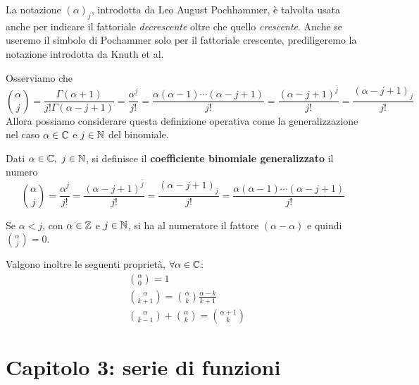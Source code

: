 \begin{attention}
		La notazione $\left(\alpha\right)_j$, introdotta da Leo August Pochhammer, è talvolta usata anche per indicare il fattoriale \textit{decrescente} oltre che quello \textit{crescente}. Anche se useremo il simbolo di Pochammer solo per il fattoriale crescente, prediligeremo la notazione introdotta da Knuth et al. %
\end{attention}
Osserviamo che
\begin{equation*}
	\binom{\alpha}{j}=\frac{\Gamma\left(\alpha+1\right)}{j!\Gamma\left(\alpha-j+1\right)}=\frac{\alpha^{\underline{j}}}{j!}=\frac{\alpha\left(\alpha-1\right)\cdots\left(\alpha-j+1\right)}{j!}=\frac{\left(\alpha-j+1\right)^{\overline{j}}}{j!}=\frac{\left(\alpha-j+1\right)_j}{j!}
\end{equation*}
Allora possiamo considerare questa definizione operativa come la generalizzazione nel caso $\alpha\in\mathbb{C}$ e $j\in\mathbb{N}$ del binomiale.
\begin{define}
	Dati $\alpha\in\complexset,\ j\in\naturalset$, si definisce il \textbf{coefficiente binomiale generalizzato} il numero
	\begin{equation}
		\binom{\alpha}{j}=\frac{\alpha^{\underline{j}}}{j!}=\frac{\left(\alpha-j+1\right)^{\overline{j}}}{j!}=\frac{\left(\alpha-j+1\right)_j}{j!}=\frac{\alpha\left(\alpha-1\right)\cdots\left(\alpha-j+1\right)}{j!}
	\end{equation}
\end{define}
\begin{observe}
	Se $\alpha<j$, con $\alpha\in\mathbb{Z}$ e $j\in\mathbb{N}$, si ha al numeratore il fattore $\left(\alpha-\alpha\right)$ e quindi $\displaystyle\binom{\alpha}{j}=0$.
\end{observe}
Valgono inoltre le seguenti proprietà, $\forall \alpha\in\mathbb{C}$:
\begin{align}
	&\binom{\alpha}{0}=1\\
	&\binom{\alpha}{k+1}=\binom{\alpha}{k}\frac{\alpha-k}{k+1}\\
	&\binom{\alpha}{k-1}+\binom{\alpha}{k}=\binom{\alpha+1}{k}
\end{align}
\section{Capitolo 3: serie di funzioni}
